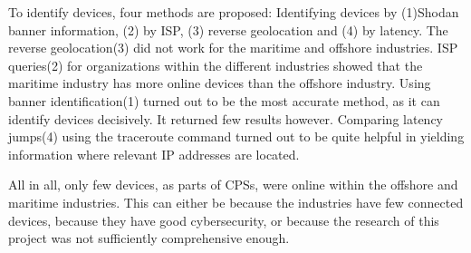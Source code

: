 To identify devices, four methods are proposed: Identifying devices by (1)Shodan banner information, (2) by ISP, (3) reverse geolocation and (4) by latency.
The reverse geolocation(3) did not work for the maritime and offshore industries. 
ISP queries(2) for organizations within the different industries showed that the maritime industry has more online devices than the offshore industry. 
Using banner identification(1) turned out to be the most accurate method, as it can identify devices decisively. It returned few results however.
Comparing latency jumps(4) using the traceroute command turned out to be quite helpful in yielding information where relevant IP addresses are located.

All in all, only few devices, as parts of CPSs, were online within the offshore and maritime industries. This can either be because the industries have few connected devices, because they have good cybersecurity, or because the research of this project was not sufficiently comprehensive enough.

\newpage

